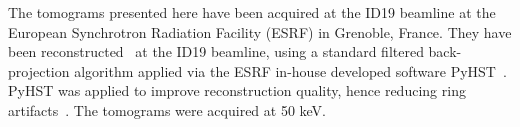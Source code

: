 The tomograms presented here have been acquired at the ID19 beamline at the
European Synchrotron Radiation Facility (ESRF) in Grenoble, France. They have
been reconstructed~\cite{sporring} at the ID19 beamline, using a standard
filtered back-projection algorithm applied via the ESRF in-house developed
software PyHST~\cite{NELDAM2015682,pyhst}. PyHST was applied to improve
reconstruction quality, hence reducing ring artifacts~\cite{MIRONE201441}. The
tomograms were acquired at 50 keV.

